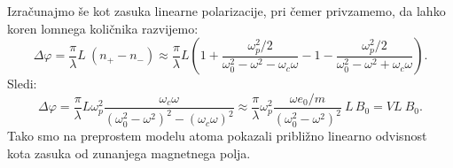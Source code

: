 Izračunajmo še kot zasuka linearne polarizacije,  pri čemer
privzamemo, da lahko koren lomnega količnika razvijemo:
\begin{equation}
\Delta \varphi = \frac{\pi}{\lambda} L~(n_+-n_-) \approx \frac{\pi}{\lambda} L
\left(1 + \frac{\omega_p^2/2}{\omega_0^2 -\omega^2 - \omega_{c}\omega}- 
1 - \frac{\omega_p^2/2}{\omega_0^2 -\omega^2 + \omega_{c}\omega}\right)\!\!.
\end{equation}
Sledi:
\begin{equation}
\Delta \varphi = \frac{\pi}{\lambda} L \omega_p^2
\frac{\omega_c\omega}{\left(\omega_0^2 -\omega^2\right)^2 - \left(\omega_{c}\omega\right)^2}
\approx \frac{\pi}{\lambda} \omega_p^2 \frac{\omega e_0 /m}{\left(\omega_0^2 -\omega^2\right)^2}~L\,B_0
= V L~B_0.
\end{equation}
Tako smo na preprostem modelu atoma pokazali približno linearno odvisnost kota zasuka od zunanjega 
magnetnega polja.
